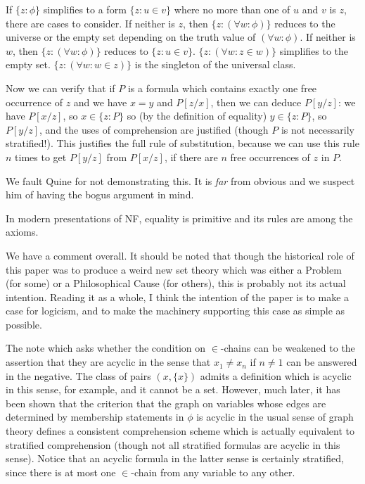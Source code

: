 \documentclass[12pt]{article}
\begin{document}
If $\{z:\phi\}$ simplifies to a form $\{z:u \in v\}$ where no more than one of $u$ and $v$ is $z$, there are cases to consider.  If neither is $z$, then
$\{z:(\forall w:\phi)\}$ reduces to the universe or the empty set depending on the truth value of $(\forall w:\phi)$.  If neither is $w$,  then
$\{z:(\forall w:\phi)\}$ reduces to $\{z:u \in v\}$.  $\{z:(\forall w:z \in w)\}$ simplifies to the empty set.  $\{z:(\forall w:w \in z)\}$ is the singleton of the universal class.

Now we can verify that if $P$ is a formula which contains exactly one free occurrence of $z$ and we have $x=y$ and $P[z/x]$, then we can deduce $P[y/z]$:  we 
 have $P[x/z]$, so $x \in \{z:P\}$ so (by the definition of equality) $y \in \{z:P\}$, so $P[y/z]$, and the uses of comprehension are justified (though $P$ is not necessarily stratified!).  This justifies the full rule of substitution, because we
can use this rule $n$ times to get $P[y/z]$ from $P[x/z]$, if there are $n$ free occurrences of $z$ in $P$.

We fault Quine for not demonstrating this.  It is {\em far\/} from obvious and we suspect him of having the bogus argument in mind.

In modern presentations of NF, equality is primitive and its rules are among the axioms.

We have a comment overall.  It should be noted that though the historical role of this paper was to produce a weird new set theory which was either a Problem (for some) or a Philosophical Cause (for others), this is probably not its actual intention.  Reading it as a whole, I think the intention of the paper is to make a case for logicism, and to make the machinery supporting this case as simple as possible.

The note which asks whether the condition on $\in$-chains can be weakened to the assertion that they are acyclic
in the sense that $x_1 \neq x_n$ if $n \neq 1$ can be answered in the negative.  The class of pairs $(x,\{x\})$ admits a definition which is acyclic in this sense, for example, and it cannot be a set.  However, much later, it has been shown that the criterion
that the graph on variables whose edges are determined by membership statements in $\phi$ is acyclic in the usual sense of graph theory defines a consistent comprehension scheme which is actually equivalent to stratified comprehension (though not all stratified formulas are acyclic in this sense).  Notice that an acyclic formula in the latter sense is certainly stratified, since there is at most one $\in$-chain from any variable to any other.
\end{document}
